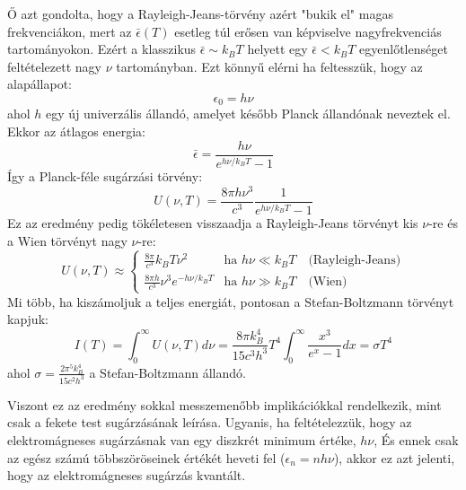 \documentclass[a4paper,12pt]{article}
\begin{document}
Ő azt gondolta, hogy a Rayleigh-Jeans-törvény azért "bukik el" magas frekvenciákon, mert az $\bar{\epsilon}(T)$ esetleg túl erősen van képviselve nagyfrekvenciás tartományokon.
Ezért a klasszikus $\bar{\epsilon} \sim k_BT$ helyett egy $\bar{\epsilon} < k_BT$ egyenlőtlenséget feltételezett nagy $\nu$ tartományban. Ezt könnyű elérni ha feltesszük, hogy az alapállapot:
\begin{equation}
    \epsilon_0 = h \nu
\end{equation}
ahol $h$ egy új univerzális állandó, amelyet később Planck állandónak neveztek el. Ekkor az átlagos energia:
\begin{equation}
    \bar{\epsilon} = \frac{h \nu}{e^{h \nu / k_BT} - 1}
\end{equation}
Így a Planck-féle sugárzási törvény:
\begin{equation}
    \boxed{U(\nu, T) = \frac{8 \pi h \nu^3}{c^3} \frac{1}{e^{h \nu / k_BT} - 1}}
\end{equation}
Ez az eredmény pedig tökéletesen visszaadja a Rayleigh-Jeans törvényt kis $\nu$-re és a Wien törvényt nagy $\nu$-re:
\begin{equation}
    U(\nu, T) \approx \begin{cases}
    \frac{8 \pi}{c^3} k_BT \nu^2 & \text{ha } h \nu \ll k_BT \quad \text{(Rayleigh-Jeans)} \\
    \frac{8 \pi h}{c^3} \nu^3 e^{-h \nu / k_BT} & \text{ha } h \nu \gg k_BT \quad \text{(Wien)}
    \end{cases}
\end{equation}
Mi több, ha kiszámoljuk a teljes energiát, pontosan a Stefan-Boltzmann törvényt kapjuk:
\begin{equation}
    I(T) = \int_0^{\infty} U(\nu, T) d\nu = \frac{8 \pi k_B^4}{15 c^3 h^3} T^4 \int_{0}^{\infty} \frac{x^3}{e^x - 1} dx = \sigma T^4
\end{equation}
ahol $\sigma = \frac{2 \pi^5 k_B^4}{15 c^2 h^3}$ a Stefan-Boltzmann állandó.

Viszont ez az eredmény sokkal messzemenőbb implikációkkal rendelkezik, mint csak a fekete test sugárzásának leírása. Ugyanis, ha feltételezzük, hogy az elektromágneses sugárzásnak van egy diszkrét minimum értéke, $h \nu$, 
És ennek csak az egész számú többszöröseinek értékét heveti fel ($\epsilon_n = n h \nu$), akkor ez azt jelenti, hogy az elektromágneses sugárzás kvantált. 
\end{document}

